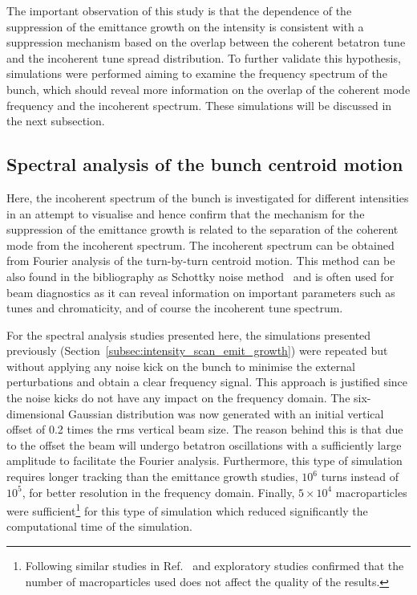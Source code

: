 The important observation of this study is that the dependence of the suppression of the emittance growth on the intensity is consistent with a suppression mechanism based on the overlap between the coherent betatron tune and the incoherent tune spread distribution. To further validate this hypothesis, simulations were performed aiming to examine the frequency spectrum of the bunch, which should reveal more information on the overlap of the coherent mode frequency and the incoherent spectrum. These simulations will be discussed in the next subsection.


\subsection{Spectral analysis of the bunch centroid motion}\label{subsec:spectral_analysis_schottky}
Here, the incoherent spectrum of the bunch is investigated for different intensities in an attempt to visualise and hence confirm that the mechanism for the suppression of the emittance growth is related to the separation of the coherent mode from the incoherent spectrum. The incoherent spectrum can be obtained from Fourier analysis of the turn-by-turn centroid motion. This method can be also found in the bibliography as Schottky noise method~\cite{Caspers:1213284} and is often used for beam diagnostics as it can reveal information on important parameters such as tunes and chromaticity, and of course the incoherent tune spectrum.


For the spectral analysis studies presented here, the simulations presented previously (Section~\ref{subsec:intensity_scan_emit_growth}) were repeated but without applying any noise kick on the bunch to minimise the external perturbations and obtain a clear frequency signal. This approach is justified since the noise kicks do not have any impact on the frequency domain. The six-dimensional Gaussian distribution was now generated with an initial vertical offset of 0.2 times the rms vertical beam size. The reason behind this is that due to the offset the beam will undergo betatron oscillations with a sufficiently large amplitude to facilitate the Fourier analysis. Furthermore, this type of simulation requires longer tracking than the emittance growth studies, $10^6$ turns instead of $10^5$, for better resolution in the frequency domain. Finally, $5 \times 10^4$ macroparticles were sufficient\footnote{Following similar studies in Ref.~\cite{Zorzano-Mier:446334} and exploratory studies confirmed that the number of macroparticles used does not affect the quality of the results.} for this type of simulation which reduced significantly the computational time of the simulation. 

